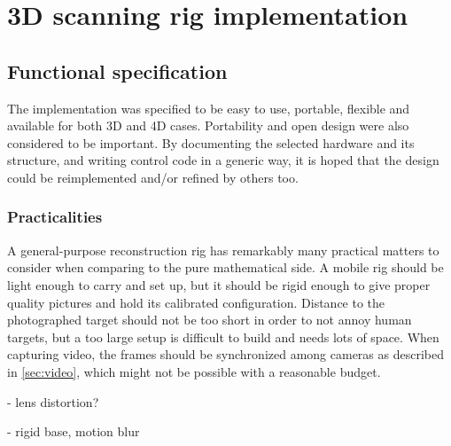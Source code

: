 \section{3D scanning rig implementation}

\subsection{Functional specification} %

The implementation was specified to be easy to use, portable, flexible and available for both 3D and 4D cases.
Portability and open design were also considered to be important.
By documenting the selected hardware and its structure, and writing control code in a generic way, it is hoped that the design could be reimplemented and/or refined by others too.




\subsubsection{Practicalities} %

A general-purpose reconstruction rig has remarkably many practical matters to consider when comparing to the pure mathematical side.
A mobile rig should be light enough to carry and set up, but it should be rigid enough to give proper quality pictures and hold its calibrated configuration.
Distance to the photographed target should not be too short in order to not annoy human targets, but a too large setup is difficult to build and needs lots of space.
When capturing video, the frames should be synchronized among cameras as described in \ref{sec:video}, which might not be possible with a reasonable budget.


- lens distortion?

- rigid base, motion blur

